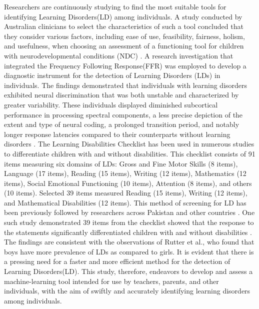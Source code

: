 \documentclass{article}
\begin{document}
\begin{multicols}{2}
\hspace*{\parindent}Researchers are continuously studying to find the most suitable tools for identifying  Learning Disorders(LD) among individuals. A study conducted by Australian clinicians to select the characteristics of such a tool concluded that they consider various factors, including ease of use, feasibility, fairness, holism, and usefulness, when choosing an assessment of a functioning tool for children with neurodevelopmental conditions (NDC) \cite{d2022australian}. A research investigation that integrated the Frequency Following Response(FFR) was employed to develop a diagnostic instrument for the detection of Learning Disorders (LDs) in individuals. The findings demonstrated that individuals with learning disorders exhibited neural discrimination that was both unstable and characterized by greater variability. These individuals displayed diminished subcortical performance in processing spectral components, a less precise depiction of the extent and type of neural coding, a prolonged transition period, and notably longer response latencies compared to their counterparts without learning disorders \cite{cordeiro2020assessment}. The Learning Disabilities Checklist has been used in numerous studies to differentiate children with and without disabilities. This checklist consists of 91 items measuring six domains of LDs: Gross and Fine Motor Skills (8 items), Language (17 items), Reading (15 items), Writing (12 items), Mathematics (12 items), Social Emotional Functioning (10 items), Attention (8 items), and others (10 items). Selected 39 items measured Reading (15 items), Writing (12 items), and Mathematical Disabilities (12 items). This method of screening for LD  has been previously followed by researchers across Pakistan and other countries \cite{malik2013screening}. One such study demonstrated 39 items from the checklist showed that the response to the statements significantly differentiated children with and without disabilities \cite{ashraf2014validation}. The findings are consistent with the observations of Rutter et al.\cite{rutter2004gender}, who found that boys have more prevalence of LDs as compared to girls. It is evident that there is a pressing need for a faster and more efficient method for the detection of Learning Disorders(LD). This study, therefore, endeavors to develop and assess a machine-learning tool intended for use by teachers, parents, and other individuals, with the aim of swiftly and accurately identifying learning disorders among individuals.





\end{multicols}
\end{document}

